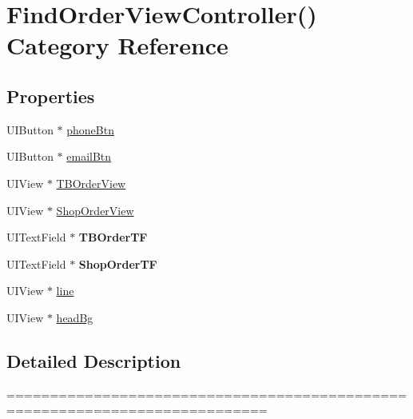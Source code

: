 \hypertarget{category_find_order_view_controller_07_08}{}\section{Find\+Order\+View\+Controller() Category Reference}
\label{category_find_order_view_controller_07_08}
\subsection*{Properties}
\begin{DoxyCompactItemize}
\item 
U\+I\+Button $\ast$ \mbox{\hyperlink{category_find_order_view_controller_07_08_a28fd001bd73cdf84ba03c836e4dd59f6}{phone\+Btn}}
\item 
U\+I\+Button $\ast$ \mbox{\hyperlink{category_find_order_view_controller_07_08_adb54e64fe58a648f9eba0676d157b6a7}{email\+Btn}}
\item 
U\+I\+View $\ast$ \mbox{\hyperlink{category_find_order_view_controller_07_08_afa79d2b48a59906a4b34924d29522f51}{T\+B\+Order\+View}}
\item 
U\+I\+View $\ast$ \mbox{\hyperlink{category_find_order_view_controller_07_08_a4ded8abc14e3c24124ee2ac5780f376c}{Shop\+Order\+View}}
\item 
\mbox{\label{category_find_order_view_controller_07_08_ab5cab304f0c19f7f4bac7694d8dfdabb}} 
U\+I\+Text\+Field $\ast$ {\bfseries T\+B\+Order\+TF}
\item 
\mbox{\label{category_find_order_view_controller_07_08_aced3824698a2da575d878cbde2a24275}} 
U\+I\+Text\+Field $\ast$ {\bfseries Shop\+Order\+TF}
\item 
U\+I\+View $\ast$ \mbox{\hyperlink{category_find_order_view_controller_07_08_a1ab3f2aa34f2db5fee80090409e6a01c}{line}}
\item 
U\+I\+View $\ast$ \mbox{\hyperlink{category_find_order_view_controller_07_08_a035b65cfae0e737f3b524ed7092077ce}{head\+Bg}}
\end{DoxyCompactItemize}


\subsection{Detailed Description}
============================================================================

